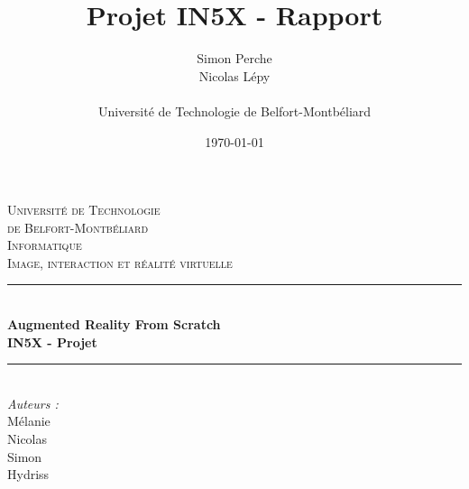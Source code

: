 \documentclass[a4paper, sans]{article}
\date{\today}
\author{Simon Perche \\ Nicolas Lépy \\ \\
Université de Technologie de Belfort-Montbéliard}
\title{Projet IN5X - Rapport}
\begin{document}
    \begin{titlepage}

      \newcommand{\HRule}{\rule{\linewidth}{0.5mm}} %
      
      \centering %
      
      
      \textsc{\LARGE Université de Technologie \\de Belfort-Montbéliard}\\[1.5cm] %
      \textsc{\Large Informatique}\\[0.5cm] %
      \textsc{\large Image, interaction et réalité virtuelle}\\[0.5cm] %
      
      
      \HRule \\[0.4cm]
      { \huge \bfseries Augmented Reality From Scratch\\IN5X - Projet}\\[0.4cm] %
      \HRule \\[1.5cm]
      

      
      \Large \emph{Auteurs :}\\
      Mélanie \\Nicolas {}\\Simon {}\\Hydriss {}\\[3cm] %
      
      

\end{titlepage}
\end{document}
